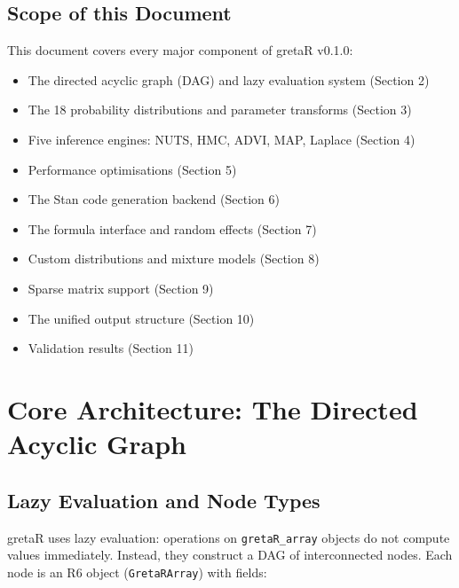 \documentclass[
  11pt,
]{article}
\providecommand{\tightlist}{%
  \setlength{\itemsep}{0pt}\setlength{\parskip}{0pt}}
\begin{document}
\subsection{Scope of this Document}\label{scope-of-this-document}

This document covers every major component of gretaR v0.1.0:

\begin{itemize}
\tightlist
\item
  The directed acyclic graph (DAG) and lazy evaluation system (Section
  2)
\item
  The 18 probability distributions and parameter transforms (Section 3)
\item
  Five inference engines: NUTS, HMC, ADVI, MAP, Laplace (Section 4)
\item
  Performance optimisations (Section 5)
\item
  The Stan code generation backend (Section 6)
\item
  The formula interface and random effects (Section 7)
\item
  Custom distributions and mixture models (Section 8)
\item
  Sparse matrix support (Section 9)
\item
  The unified output structure (Section 10)
\item
  Validation results (Section 11)
\end{itemize}

\section{Core Architecture: The Directed Acyclic
Graph}\label{core-architecture-the-directed-acyclic-graph}

\subsection{Lazy Evaluation and Node
Types}\label{lazy-evaluation-and-node-types}

gretaR uses lazy evaluation: operations on \texttt{gretaR\_array}
objects do not compute values immediately. Instead, they construct a DAG
of interconnected nodes. Each node is an R6 object
(\texttt{GretaRArray}) with fields:
\end{document}
